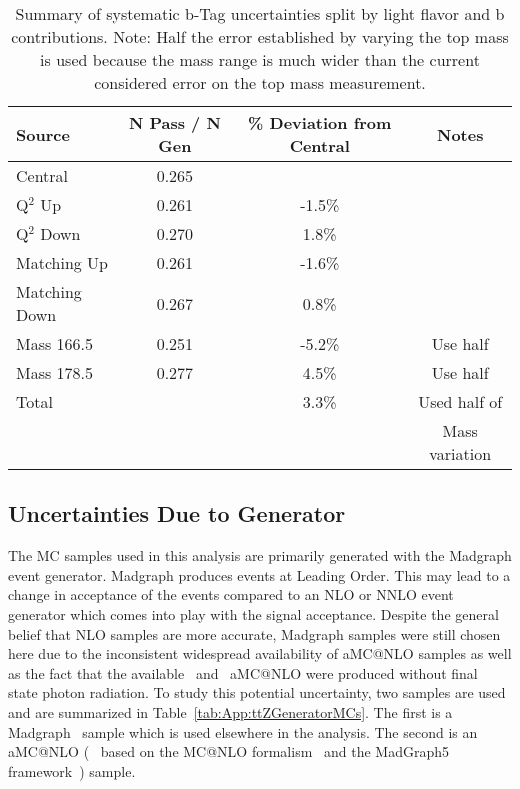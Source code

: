 \begin{table}[h]
\caption{\label{tab:systupdown} Summary of systematic b-Tag uncertainties split by light flavor and b contributions. Note: Half the error established by varying the top mass is used because the mass range is much wider than the current considered error on the top mass measurement.}
\begin{center}
\begin{tabular}{lccc}\hline
Source                  &  N Pass / N Gen & \% Deviation from Central & Notes\\ \hline
Central                 & 0.265 & & \\
Q$^2$ Up                 & 0.261 & -1.5\% & \\
Q$^2$ Down           & 0.270 & 1.8\% & \\
Matching Up       & 0.261 & -1.6\% & \\
Matching Down  & 0.267 & 0.8\% & \\
Mass 166.5         & 0.251 & -5.2\% & Use half \\
Mass 178.5         & 0.277 & 4.5\% & Use half \\
\hline
Total                     &             & 3.3\% & Used half of\\
                              &             &             & Mass variation \\
\hline
\end{tabular}
\end{center}
\end{table}



\subsection{Uncertainties Due to Generator}	

The MC samples used in this analysis are primarily generated with the Madgraph event generator. Madgraph produces events at Leading Order. This may lead to a change in acceptance of the events compared to an NLO or NNLO event generator which comes into play with the signal acceptance. Despite the general belief that NLO samples are more accurate, Madgraph samples were still chosen here due to the inconsistent widespread availability of aMC@NLO samples as well as the fact that the available \ttZ \ and \ttW \ aMC@NLO were produced without final state photon radiation. To study this potential uncertainty, two \ttZ samples are used and are summarized in Table~\ref{tab:App:ttZGeneratorMCs}. The first is a Madgraph~\cite{Alwall:2011uj} sample which is used elsewhere in the analysis. The second is an aMC@NLO (~\cite{Frederix:2011zi, Frederix:2011ss} based on the MC@NLO formalism~\cite{Frixione:2002ik} and the MadGraph5 framework~\cite{Alwall:2011uj}) sample. \\




